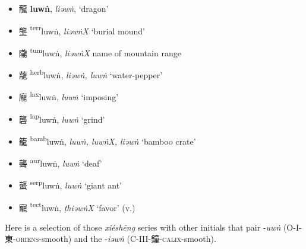 \begin{itemize}
    \item {\Large{龍}} %
    {\large{\textbf{luwṅ}}},
    \textit{liəwṅ},  {} `dragon' %

    \item {\Large{壟}} %
    {\large{{\textsuperscript{terr}}luwṅ}},
    \textit{liəwṅX} `burial mound' %

    \item {\Large{隴}} %
    {\large{{\textsuperscript{tum}}luwṅ}},
    \textit{liəwṅX} 
    name of mountain range  %

    \item {\Large{蘢}} %
    {\large{{\textsuperscript{herb}}luwṅ}},
    \textit{liəwṅ, luwṅ} `water-pepper' %

    \item {\Large{龐}} %
    {\large{{\textsuperscript{lax}}luwṅ}},
    \textit{luwṅ} `imposing' %

    \item {\Large{礱}} %
    {\large{{\textsuperscript{lap}}luwṅ}},
    \textit{luwṅ} `grind' %

    \item {\Large{籠}} %
    {\large{{\textsuperscript{bamb}}luwṅ}},
    \textit{luwṅ, luwṅX, liəwṅ} `bamboo crate' %

    \item {\Large{聾}} %
    {\large{{\textsuperscript{aur}}luwṅ}},
    \textit{luwṅ} `deaf' %

    \item {\Large{蠪}} %
    {\large{{\textsuperscript{serp}}luwṅ}},
    \textit{luwṅ} `giant ant' %

    \item {\Large{寵}} %
    {\large{{\textsuperscript{tect}}luwṅ}},
    \textit{ṭhiəwṅX} `favor' (v.) %
\end{itemize}

Here is a selection of those \textit{xiéshēng} series with other initials that pair -\textit{uwṅ} (O-I-東-\textsc{oriens}-smooth) and the -\textit{iəwṅ} (C-III-鐘-\textsc{calix}-smooth). 


